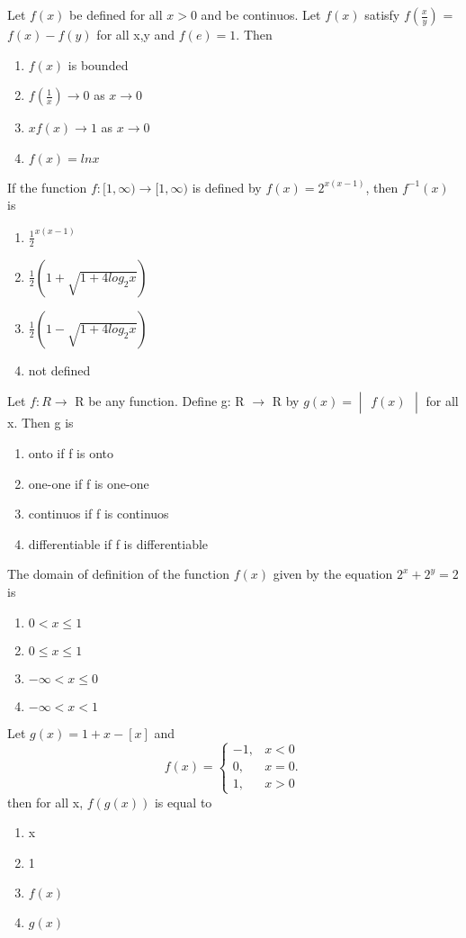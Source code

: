 \item Let $f(x)$ be defined for all $x > 0$ and be continuos. Let $f(x)$ satisfy $f(\frac{x}{y})$ = $f(x)-f(y)$ for all x,y and $f(e)=1$. Then
\begin{enumerate}
\item $f(x)$ is bounded
\item $f(\frac{1}{x}) \to 0$ as $x \to 0$
\item $xf(x)\to 1$ as $x \to 0$
\item $f(x)=ln x$
\end{enumerate}

\item If the function $f:[1,\infty) \rightarrow [1,\infty)$ is defined by $f(x)=2^{x(x-1)}$, then $f^{-1}(x)$ is
\begin{enumerate}
\item $\frac{1}{2}^{x(x-1)}$
\item $\frac{1}{2}(1+\sqrt{1+4log_2x})$
\item $\frac{1}{2}(1-\sqrt{1+4log_2x})$
\item not defined
\end{enumerate}

\item Let $f: R\rightarrow$ R be any function. Define g: R $\rightarrow$ R by $g(x)=\begin{vmatrix} f(x) \end{vmatrix}$ for all x. Then g is
\begin{enumerate}
\item onto if f is onto
\item one-one if f is one-one
\item continuos if f is continuos
\item differentiable if f is differentiable
\end{enumerate} 

\item The domain of definition of the function $f(x)$ given by the equation $2^{x} + 2^{y} = 2$ is 
\begin{enumerate}
\item $0< x \leq 1$
\item $0 \leq x \leq 1$
\item $-\infty < x \leq 0$
\item $-\infty < x < 1$
\end{enumerate}

\item Let $g(x) = 1+x-[x]$ and \[f(x)=\begin{cases} 
      -1, & x < 0\\
       0, & x = 0.\\
       1, & x > 0 
   \end{cases}\] then for all x, $f(g(x))$ is equal to
\begin{enumerate}
\item x
\item 1
\item $f(x)$
\item $g(x)$
\end{enumerate} 

